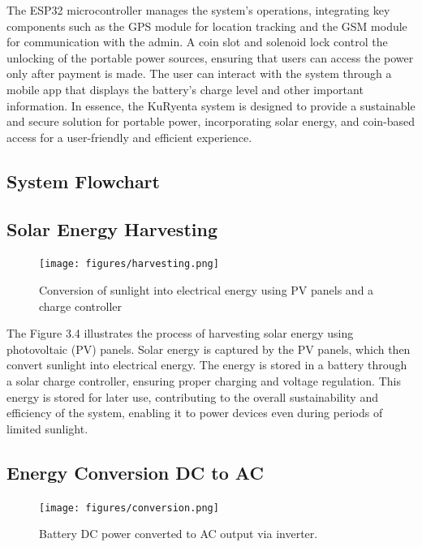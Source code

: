 {The ESP32 microcontroller manages the system's operations, integrating key components such as the GPS module for location tracking and the GSM module for communication with the admin. A coin slot and solenoid lock control the unlocking of the portable power sources, ensuring that users can access the power only after payment is made. The user can interact with the system through a mobile app that displays the battery's charge level and other important information. In essence, the KuRyenta system is designed to provide a sustainable and secure solution for portable power, incorporating solar energy, and coin-based access for a user-friendly and efficient experience.


\subsection{System  Flowchart}



\subsection{Solar Energy Harvesting}

\begin{figure}[H]
	\centering
	\caption{Conversion of sunlight into electrical energy using PV panels and a charge controller}
	\label{fig:solar harvesting}
	\texttt{[image: figures/harvesting.png]}
\end{figure}

The Figure 3.4 illustrates the process of harvesting solar energy using photovoltaic (PV) panels. Solar energy is captured by the PV panels, which then convert sunlight into electrical energy. The energy is stored in a  battery through a solar charge controller, ensuring proper charging and voltage regulation. This energy is stored for later use, contributing to the overall sustainability and efficiency of the system, enabling it to power devices even during periods of limited sunlight.

\subsection{Energy Conversion DC to AC}

\begin{figure}[H]
	\centering
	\caption{Battery DC power converted to AC output via inverter.}
	\label{fig:energy conversion}
	\texttt{[image: figures/conversion.png]}
\end{figure}

}
